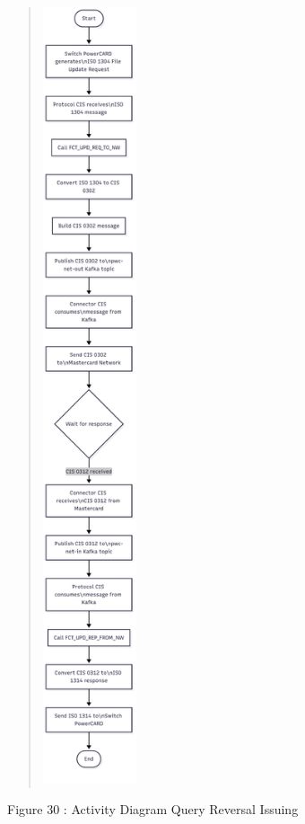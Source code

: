 \documentclass[12pt,a4paper]{report}
\begin{document}
\begin{quote}
\includegraphics[width=1.08518in,height=9in]{vertopal_d1b0b2209edd4c6aa8254f57daa0953b/media/image49.png}
\end{quote}

\protect\hypertarget{_Toc201954506}{}{}Figure 30 : Activity Diagram
Query Reversal Issuing
\end{document}
